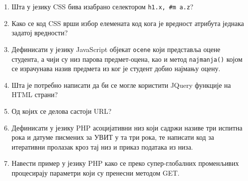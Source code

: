 \documentclass[a4paper]{article}
\begin{document}
\begin{enumerate}
\hrulefill

\hrulefill

\hrulefill

\item Шта у језику CSS бива изабрано селектором \verb|h1.x, #m a.z|?

\hrulefill

\hrulefill

\hrulefill

\item Како се код CSS врши избор елемената код кога је вредност атрибута једнака задатој вредности?

\hrulefill

\hrulefill

\hrulefill

\item Дефинисати у језику JavaScript објекат \verb|ocene| који представља
  оцене студента, а чији су низ парова предмет-оцена, као и метод \verb|najmanja()| којом се 
	израчунава назив предмета из ког је студент добио најмању оцену.

\hrulefill

\hrulefill

\hrulefill

\item Шта је потребно написати да би се могле користити JQuery функције на HTML страни?

\hrulefill

\hrulefill

\hrulefill

\item Од којих се делова састоји URL?


\hrulefill

\hrulefill

\hrulefill

\item Дефинисати у језику PHP асоцијативни низ који садржи називе три испитна рока и
датуме писмених за УВИТ у та три рока, те написати код за
итеративни пролазак кроз тај низ и приказ података из низа.

\hrulefill

\hrulefill

\hrulefill

\item Навести пример у језику PHP како се преко супер-глобалних променљивих процесирају параметри који су пренесни методом GET.

\hrulefill


\end{enumerate}
\end{document}
